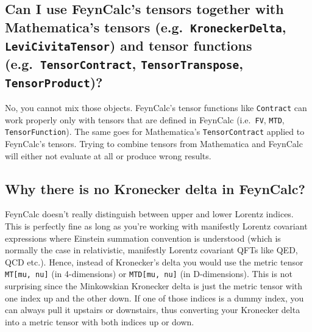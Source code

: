 \documentclass[../FeynCalcManual.tex]{subfiles}
\begin{document}
\hypertarget{can-i-use-feyncalcs-tensors-together-with-mathematicas-tensors-e.g.-kroneckerdelta-levicivitatensor-and-tensor-functions-e.g.-tensorcontract-tensortranspose-tensorproduct}{%
\subsection{\texorpdfstring{Can I use FeynCalc's tensors together with
Mathematica's tensors (e.g.~\texttt{KroneckerDelta},
\texttt{LeviCivitaTensor}) and tensor functions
(e.g.~\texttt{TensorContract}, \texttt{TensorTranspose},
\texttt{TensorProduct})?}{Can I use FeynCalc's tensors together with Mathematica's tensors (e.g.~, ) and tensor functions (e.g.~, , )?}}\label{can-i-use-feyncalcs-tensors-together-with-mathematicas-tensors-e.g.-kroneckerdelta-levicivitatensor-and-tensor-functions-e.g.-tensorcontract-tensortranspose-tensorproduct}}

No, you cannot mix those objects. FeynCalc's tensor functions like
\texttt{Contract} can work properly only with tensors that are defined
in FeynCalc (i.e.~\texttt{FV}, \texttt{MTD}, \texttt{TensorFunction}).
The same goes for Mathematica's \texttt{TensorContract} applied to
FeynCalc's tensors. Trying to combine tensors from Mathematica and
FeynCalc will either not evaluate at all or produce wrong results.

\hypertarget{why-there-is-no-kronecker-delta-in-feyncalc}{%
\subsection{Why there is no Kronecker delta in
FeynCalc?}\label{why-there-is-no-kronecker-delta-in-feyncalc}}

FeynCalc doesn't really distinguish between upper and lower Lorentz
indices. This is perfectly fine as long as you're working with
manifestly Lorentz covariant expressions where Einstein summation
convention is understood (which is normally the case in relativistic,
manifestly Lorentz covariant QFTs like QED, QCD etc.). Hence, instead of
Kronecker's delta you would use the metric tensor
\texttt{MT[\allowbreak{}mu,\ \allowbreak{}nu]} (in 4-dimensions) or
\texttt{MTD[\allowbreak{}mu,\ \allowbreak{}nu]} (in D-dimensions). This
is not surprising since the Minkowskian Kronecker delta is just the
metric tensor with one index up and the other down. If one of those
indices is a dummy index, you can always pull it upstairs or downstairs,
thus converting your Kronecker delta into a metric tensor with both
indices up or down.
\end{document}
